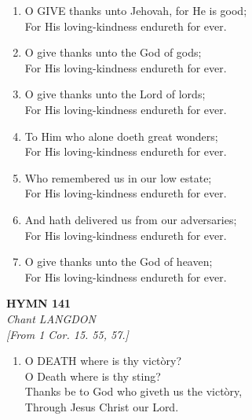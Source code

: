 \documentclass[11pt,a4paper]{article}
\begin{document}
\begin{enumerate}
    \item O GIVE thanks unto Jehovah, for He is good; \\
        For His loving-kindness endureth for ever.

    \item O give thanks unto the God of gods; \\
        For His loving-kindness endureth for ever.

    \item O give thanks unto the Lord of lords; \\
        For His loving-kindness endureth for ever.

    \item To Him who alone doeth great wonders; \\
        For His loving-kindness endureth for ever.

    \item Who remembered us in our low estate; \\
        For His loving-kindness endureth for ever.

    \item And hath delivered us from our adversaries; \\
        For His loving-kindness endureth for ever.

    \item O give thanks unto the God of heaven; \\
        For His loving-kindness endureth for ever.

\end{enumerate}

\newpage
\begin{center}
    {\Large \textbf{HYMN 141}}
    \\
    \textit{Chant LANGDON}
    \\
    \textit{\small [From 1 Cor. 15. 55, 57.]}
\end{center}
\vspace{1em}

\begin{enumerate}
    \item O DEATH where is thy vict\`ory? \\
        O Death where is thy sting? \\
        Thanks be to God who giveth us the vict\`ory, \\
        Through Jesus Christ our Lord.

\end{enumerate}
\end{document}

